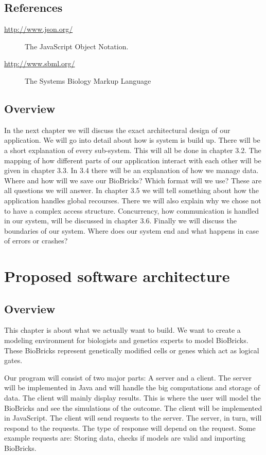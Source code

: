 \documentclass[a4paper]{article}
\begin{document}
\subsection{References}
\begin{description}
	\item[\url{http://www.json.org/}] The JavaScript Object Notation.
	\item[\url{http://www.sbml.org/}] The Systems Biology Markup Language
\end{description}

\subsection{Overview}
In the next chapter we will discuss the exact architectural design of our application. We will go into detail about how is system is build up. There will be a short explanation of every sub-system. This will all be done in chapter 3.2. The mapping of how different parts of our application interact with each other will be given in chapter 3.3. In 3.4 there will be an explanation of how we manage data. Where and how will we save our BioBricks? Which format will we use? These are all questions we will answer. In chapter 3.5 we will tell something about how the application handles global recourses. There we will also explain why we chose not to have a complex access structure. Concurrency, how communication is handled in our system, will be discussed in chapter 3.6. Finally we will discuss the boundaries of our system. Where does our system end and what happens in case of errors or crashes? 

\section{Proposed software architecture}
\subsection{Overview}
This chapter is about what we actually want to build. We want to create a modeling environment for biologists and genetics experts to model BioBricks. These BioBricks represent genetically modified cells or genes which act as logical gates. 


Our program will consist of two major parts: A server and a client. The server will be implemented in Java and will handle the big computations and storage of data. The client will mainly display results. This is where the user will model the BioBricks and see the simulations of the outcome. The client will be implemented in JavaScript. The client will send requests to the server. The server, in turn, will respond to the requests. The type of response will depend on the request. Some example requests are: Storing data, checks if models are valid and importing BioBricks. 
\end{document}
